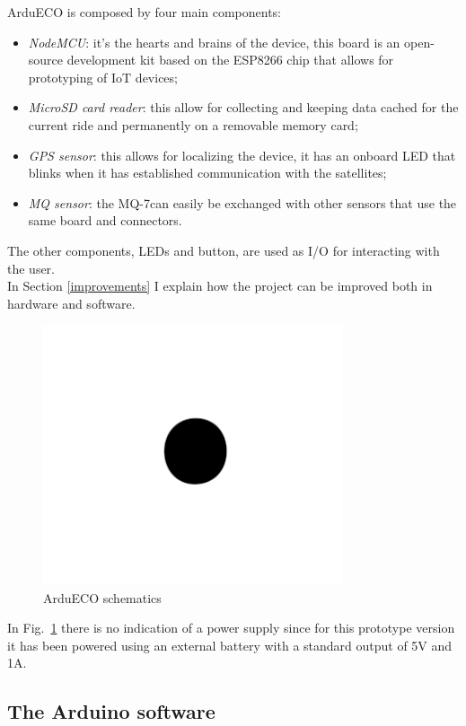 \documentclass[conference]{IEEEtran}
\begin{document}
		ArduECO is composed by four main components:
		\begin{itemize}
			\item \textit{NodeMCU}: it's the hearts and brains of the device, this board is an open-source development kit based on the ESP8266 chip that allows for prototyping of IoT devices;
			\item \textit{MicroSD card reader}: this allow for collecting and keeping data cached for the current ride and permanently on a removable memory card;
			\item \textit{GPS sensor}: this allows for localizing the device, it has an onboard LED that blinks when it has established communication with the satellites;
			\item \textit{MQ sensor}: the MQ-7can easily be exchanged with other sensors that use the same board and connectors.
		\end{itemize}
		The other components, LEDs and button, are used as I/O for interacting with the user.\\
		In Section \ref{improvements} I explain how the project can be improved both in hardware and software.
		\begin{figure}[htbp]
			\centerline{\includegraphics[width=8.8cm]{fig1.png}}
			\caption{ArduECO schematics}
			\label{schematics}
		\end{figure}
		In Fig.~\ref{schematics} there is no indication of a power supply since for this prototype version it has been powered using an external battery with a standard output of 5V and 1A.
	
	\subsection{The Arduino software}
	
\end{document}
